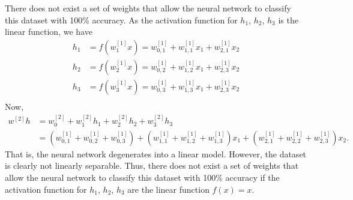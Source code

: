 \documentclass[12pt,letterpaper,boxed]{hmcpset}
\begin{document}
\begin{solution}
\begin{enumerate}[(a)]
  There does not exist a set of weights that allow the neural network to classify this dataset with 100\% accuracy. As the activation function for $h_1$, $h_2$, $h_3$ is the linear function, we have
  \[
    \begin{aligned}
      h_1 &= f(w_{1}^{[1]} x) = w_{0,1}^{[1]} + w_{1,1}^{[1]} x_1 + w_{2,1}^{[1]} x_2 \\
      h_2 &= f(w_{2}^{[1]} x) = w_{0,2}^{[1]} + w_{1,2}^{[1]} x_1 + w_{2,3}^{[1]} x_2 \\ 
      h_3 &= f(w_{3}^{[1]} x) = w_{0,3}^{[1]} + w_{1,3}^{[1]} x_1 + w_{2,3}^{[1]} x_2 \\
    \end{aligned}
  \]
  Now, 
  \[
    \begin{aligned}
      w^{[2]} h &= w_{0}^{[2]} + w_{1}^{[2]} h_1 + w_{2}^{[2]} h_2 + w_{3}^{[2]} h_3 \\
      &= (w_{0,1}^{[1]} + w_{0,2}^{[1]} + w_{0,3}^{[1]}) + (w_{1,1}^{[1]} + w_{1,2}^{[1]} + w_{1,3}^{[1]}) x_1 + (w_{2,1}^{[1]} + w_{2,2}^{[1]} + w_{2,3}^{[1]}) x_2.
    \end{aligned}
  \]
  That is, the neural network degenerates into a linear model. However, the dataset is clearly not linearly separable. Thus, there does not exist a set of weights that allow the neural network to classify this dataset with 100\% accuracy if the activation function for $h_1$, $h_2$, $h_3$ are the linear function $f(x) = x$.
  
\end{enumerate}
\end{solution}
\end{document}
